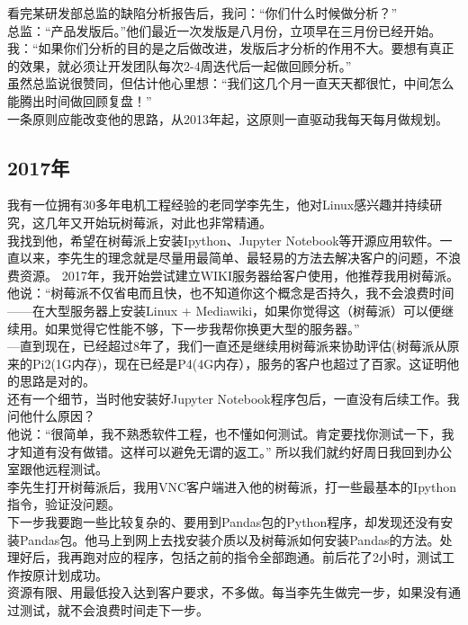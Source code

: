 \documentclass{book}        %
\date{}
\begin{document}
看完某研发部总监的缺陷分析报告后，我问：``你们什么时候做分析？''\\
总监：``产品发版后。''他们最近一次发版是八月份，立项早在三月份已经开始。\\
我：``如果你们分析的目的是之后做改进，发版后才分析的作用不大。要想有真正的效果，就必须让开发团队每次2-4周迭代后一起做回顾分析。''\\
虽然总监说很赞同，但估计他心里想：``我们这几个月一直天天都很忙，中间怎么能腾出时间做回顾复盘！''\\
一条原则应能改变他的思路，从2013年起，这原则一直驱动我每天每月做规划。

\hypertarget{ux5e74}{%
\subsection{2017年}\label{ux5e74}}

我有一位拥有30多年电机工程经验的老同学李先生，他对Linux感兴趣并持续研究，这几年又开始玩树莓派，对此也非常精通。\\
我找到他，希望在树莓派上安装Ipython、Jupyter
Notebook等开源应用软件。一直以来，李先生的理念就是尽量用最简单、最轻易的方法去解决客户的问题，不浪费资源。
2017年，我开始尝试建立WIKI服务器给客户使用，他推荐我用树莓派。\\
他说：``树莓派不仅省电而且快，也不知道你这个概念是否持久，我不会浪费时间------在大型服务器上安装Linux
+
Mediawiki，如果你觉得这（树莓派）可以便继续用。如果觉得它性能不够，下一步我帮你换更大型的服务器。''\\
---直到现在，已经超过8年了，我们一直还是继续用树莓派来协助评估(树莓派从原来的Pi2(1G内存)，现在已经是P4(4G内存），服务的客户也超过了百家。这证明他的思路是对的。\\
还有一个细节，当时他安装好Jupyter
Notebook程序包后，一直没有后续工作。我问他什么原因？\\
他说：``很简单，我不熟悉软件工程，也不懂如何测试。肯定要找你测试一下，我才知道有没有做错。这样可以避免无谓的返工。''
所以我们就约好周日我回到办公室跟他远程测试。\\
李先生打开树莓派后，我用VNC客户端进入他的树莓派，打一些最基本的Ipython指令，验证没问题。\\
下一步我要跑一些比较复杂的、要用到Pandas包的Python程序，却发现还没有安装Pandas包。他马上到网上去找安装介质以及树莓派如何安装Pandas的方法。处理好后，我再跑对应的程序，包括之前的指令全部跑通。前后花了2小时，测试工作按原计划成功。\\
资源有限、用最低投入达到客户要求，不多做。每当李先生做完一步，如果没有通过测试，就不会浪费时间走下一步。
\end{document}
